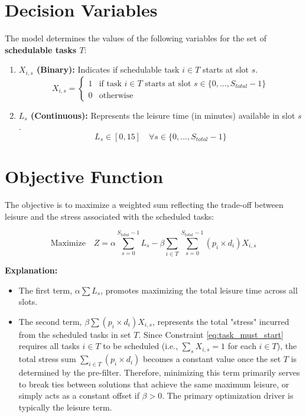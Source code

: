 \documentclass{article}
\begin{document}
\section{Decision Variables}

The model determines the values of the following variables for the set of \textbf{schedulable tasks $T$}:

\begin{enumerate}
    \item \textbf{$X_{i,s}$ (Binary):} Indicates if schedulable task $i \in T$ starts at slot $s$.
    \[ X_{i,s} = \begin{cases} 1 & \text{if task } i \in T \text{ starts at slot } s \in \{0, ..., S_{total}-1\} \\ 0 & \text{otherwise} \end{cases} \]

    \item \textbf{$L_{s}$ (Continuous):} Represents the leisure time (in minutes) available in slot $s$.
    \[ L_{s} \in [0, 15] \quad \forall s \in \{0, ..., S_{total}-1\} \]
\end{enumerate}

\section{Objective Function}

The objective is to maximize a weighted sum reflecting the trade-off between leisure and the stress associated with the scheduled tasks:

\[
\text{Maximize} \quad Z = \alpha \sum_{s=0}^{S_{total}-1} L_s - \beta \sum_{i \in T} \sum_{s=0}^{S_{total}-1} (p_i \times d_i) X_{i,s}
\]

\textbf{Explanation:}
\begin{itemize}
    \item The first term, $\alpha \sum L_s$, promotes maximizing the total leisure time across all slots.
    \item The second term, $\beta \sum (p_i \times d_i) X_{i,s}$, represents the total "stress" incurred from the scheduled tasks in set $T$. Since Constraint \ref{eq:task_must_start} requires all tasks $i \in T$ to be scheduled (i.e., $\sum_s X_{i,s} = 1$ for each $i \in T$), the total stress sum $\sum_{i \in T} (p_i \times d_i)$ becomes a constant value once the set $T$ is determined by the pre-filter. Therefore, minimizing this term primarily serves to break ties between solutions that achieve the same maximum leisure, or simply acts as a constant offset if $\beta > 0$. The primary optimization driver is typically the leisure term.
\end{itemize}
\end{document}

